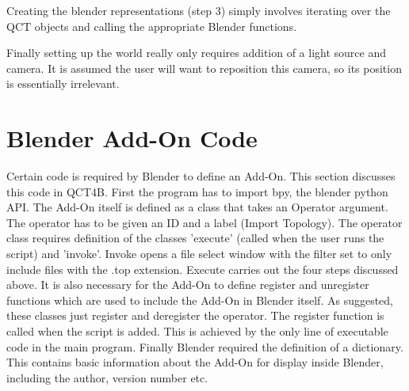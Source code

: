 \documentclass{report}
\begin{document}
Creating the blender representations (step 3) simply involves iterating over the QCT objects and calling the 
appropriate Blender functions.

Finally setting up the world really only requires addition of a light source and camera.
It is assumed the user will want to reposition this camera, so its position is essentially irrelevant.

\section{Blender Add-On Code}

Certain code is required by Blender to define an Add-On. This section discusses this code in QCT4B.
First the program has to import bpy, the blender python API.
The Add-On itself is defined as a class that takes an Operator argument.
The operator has to be given an ID 
 and a label (Import Topology).
The operator class requires definition of the classes 'execute' (called when the user runs the script)
and 'invoke'.
Invoke opens a file select window with the filter set to only include files with the .top extension.
Execute carries out the four steps discussed above.
It is also necessary for the Add-On to define register and unregister functions which are used to include the Add-On 
in Blender itself.
As suggested, these classes just register and deregister the operator. The register function is called when the 
script is added.
This is achieved by the only line of executable code in the main program.
Finally Blender required the definition of a dictionary. %
This contains basic information about the Add-On for display inside Blender, including the author, version number etc.
\end{document}
